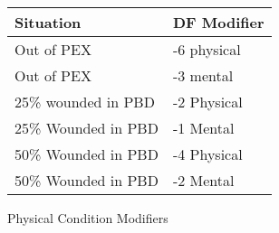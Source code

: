 \begin{SHTable}[h]
	\begin{tabular}{ll}
	Situation			& DF Modifier	\\ 
	\hline
	Out of PEX			& -6 physical	\\
	Out of PEX			& -3 mental		\\
	25\% wounded in PBD & -2 Physical	\\
	25\% Wounded in PBD & -1 Mental		\\
	50\% Wounded in PBD & -4 Physical	\\
	50\% Wounded in PBD & -2 Mental		\\ 
    \end{tabular}
    \caption{Physical Condition Modifiers}
\end{SHTable}

